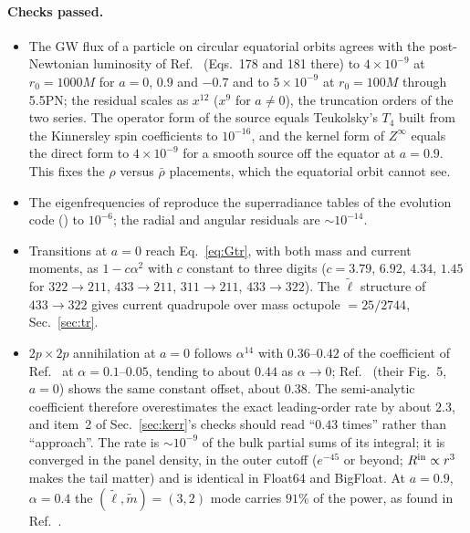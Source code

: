 \documentclass[11pt]{article}
\newcommand{\code}[1]{\path{#1}}
\begin{document}
\paragraph{Checks passed.}
\begin{itemize}
\item The GW flux of a particle on circular equatorial orbits agrees with the post-Newtonian luminosity of Ref.~\cite{ST03} (Eqs.~178 and 181 there) to $4\times10^{-9}$ at $r_0=1000M$ for $a=0$, $0.9$ and $-0.7$ and to $5\times10^{-9}$ at $r_0=100M$ through 5.5PN; the residual scales as $x^{12}$ ($x^9$ for $a\neq0$), the truncation orders of the two series. The operator form of the source equals Teukolsky's $T_4$ built from the Kinnersley spin coefficients to $10^{-16}$, and the kernel form of $Z^\infty$ equals the direct form to $4\times10^{-9}$ for a smooth source off the equator at $a=0.9$. This fixes the $\rho$ versus $\bar\rho$ placements, which the equatorial orbit cannot see.
\item The eigenfrequencies of \code{kerr_mode} reproduce the superradiance tables of the evolution code (\code{Imag_ergC_*.npz}) to $10^{-6}$; the radial and angular residuals are $\sim10^{-14}$.
\item Transitions at $a=0$ reach Eq.~\eqref{eq:Gtr}, with both mass and current moments, as $1-c\alpha^2$ with $c$ constant to three digits ($c=3.79$, $6.92$, $4.34$, $1.45$ for $322\to211$, $433\to211$, $311\to211$, $433\to322$). The $\tilde\ell$ structure of $433\to322$ gives current quadrupole over mass octupole $=25/2744$, Sec.~\ref{sec:tr}.
\item $2p\times2p$ annihilation at $a=0$ follows $\alpha^{14}$ with $0.36$--$0.42$ of the coefficient of Ref.~\cite{Brito17} at $\alpha=0.1$--$0.05$, tending to about $0.44$ as $\alpha\to0$; Ref.~\cite{YK14} (their Fig.~5, $a=0$) shows the same constant offset, about $0.38$. The semi-analytic coefficient therefore overestimates the exact leading-order rate by about $2.3$, and item~2 of Sec.~\ref{sec:kerr}'s checks should read ``$0.43$ times'' rather than ``approach''. The rate is $\sim10^{-9}$ of the bulk partial sums of its integral; it is converged in the panel density, in the outer cutoff ($e^{-45}$ or beyond; $R^{\rm in}\propto r^3$ makes the tail matter) and is identical in Float64 and BigFloat. At $a=0.9$, $\alpha=0.4$ the $(\tilde\ell,\tilde m)=(3,2)$ mode carries $91\%$ of the power, as found in Ref.~\cite{YK14}.
\end{itemize}
\end{document}
